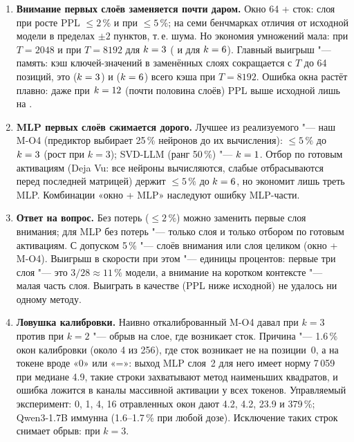 \documentclass[10pt,a4paper]{article}
\begin{document}
\begin{enumerate}
  \item \textbf{Внимание первых слоёв заменяется почти даром.} Окно 64 + сток:
    \kTwoWin{} слоя при росте PPL $\le 2\,\%$ и \kFiveWin{} при $\le 5\,\%$;
    на семи бенчмарках отличия от исходной модели в пределах $\pm 2$ пунктов,
    т.\,е. шума. Но экономия умножений мала: \saveTwoWinShort{} при $T=2048$ и
    \saveTwoWinLong{} при $T=8192$ для $k=3$ (\saveFiveWinShort{} и
    \saveFiveWinLong{} для $k=6$). Главный выигрыш "--- память: кэш
    ключей-значений в заменённых слоях сокращается с $T$ до 64 позиций, это
    \kvTwoWin{} ($k=3$) и \kvFiveWin{} ($k=6$) всего кэша при $T=8192$.
    Ошибка окна растёт плавно: даже при $k=12$ (почти половина слоёв) PPL выше
    исходной лишь на \dpplLastWin. \InfoB
  \item \textbf{MLP первых слоёв сжимается дорого.} Лучшее из реализуемого "---
    наш M-O4 (предиктор выбирает 25\,\% нейронов до их вычисления): $\le 5\,\%$
    до $k=3$ (рост \dpplRoutedKThree{} при $k=3$); SVD-LLM (ранг 50\,\%) "---
    $k=1$. Отбор по готовым активациям (Deja Vu: все нейроны вычисляются,
    слабые отбрасываются перед последней матрицей) держит $\le 5\,\%$ до
    $k=6$, но экономит лишь треть MLP. Комбинации «окно + MLP»
    наследуют ошибку MLP-части.
  \item \textbf{Ответ на вопрос.} Без потерь ($\le 2\,\%$) можно заменить
    первые \kTwoWin{} слоя внимания; для MLP без потерь "--- только \kTwoOracle{} слоя
    и только отбором по готовым активациям. С допуском 5\,\% "--- \kFiveWin{} слоёв
    внимания или \kFiveWinRouted{} слоя целиком (окно + M-O4). Выигрыш в скорости
    при этом "--- единицы процентов: первые три слоя "--- это $3/28\approx 11\,\%$
    модели, а внимание на коротком контексте "--- малая часть слоя. Выиграть в
    качестве (PPL ниже исходной) не удалось ни одному методу.
  \item \textbf{Ловушка калибровки.} Наивно откалиброванный M-O4 давал
    \dpplRoutedNaiveKThree{} при $k=3$ против \dpplRoutedNaiveKTwo{} при $k=2$ "---
    обрыв на слое, где возникает сток. Причина "--- 1.6\,\% окон калибровки (около 4 из 256),
    где сток возникает не на позиции~0, а на токене вроде «0» или «=»: выход MLP слоя~2
    для него имеет норму 7\,059 при медиане 4.9, такие строки захватывают метод наименьших
    квадратов, и ошибка ложится в каналы массивной активации у всех токенов. Управляемый
    эксперимент: 0, 1, 4, 16 отравленных окон дают 4.2, 4.2, 23.9 и 379\,\%; Qwen3-1.7B
    иммунна (1.6--1.7\,\% при любой дозе). Исключение таких строк снимает обрыв:
    \dpplRoutedKThree{} при $k=3$.
\end{enumerate}
\end{document}
